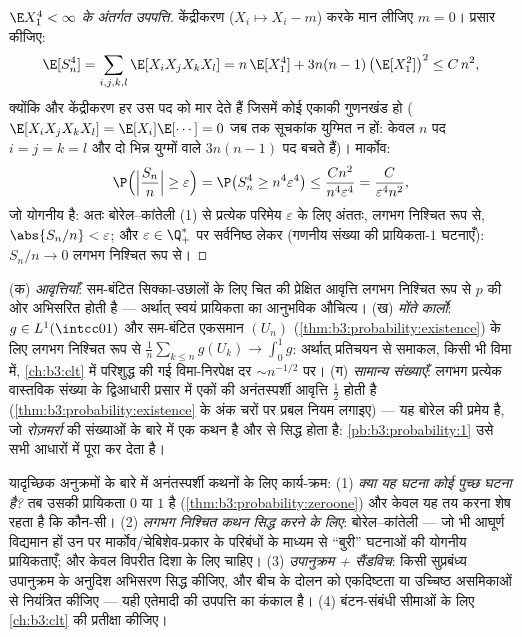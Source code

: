\begin{proof}[$\E X_1^4 < \infty$ के अंतर्गत उपपत्ति]
केंद्रीकरण ($X_i \mapsto X_i - m$) करके मान लीजिए $m = 0$। प्रसार कीजिए:
\[
\E[S_n^4] = \sum_{i,j,k,l}\E[X_iX_jX_kX_l]
= n\,\E[X_1^4] + 3n(n-1)\,\bigl(\E[X_1^2]\bigr)^2 \leq
C\,n^2 ,
\]
क्योंकि  और केंद्रीकरण हर उस पद को मार देते हैं जिसमें
कोई एकाकी गुणनखंड हो ($\E[X_iX_jX_kX_l] =
\E[X_i]\E[\cdots] = 0$ जब तक सूचकांक युग्मित न हों: केवल
$n$ पद $i=j=k=l$ और दो भिन्न युग्मों वाले $3n(n-1)$ पद बचते हैं)।
मार्कोव:
\[
\P\Bigl(\Bigl|\frac{S_n}n\Bigr| \geq \varepsilon\Bigr)
= \P\bigl(S_n^4 \geq n^4\varepsilon^4\bigr)
\leq \frac{Cn^2}{n^4\varepsilon^4} =
\frac{C}{\varepsilon^4n^2},
\]
जो योगनीय है: अतः बोरेल--कांतेली (1) से प्रत्येक परिमेय $\varepsilon$ के
लिए अंततः, लगभग निश्चित रूप से, $\abs{S_n/n} < \varepsilon$; और $\varepsilon \in \Q_+^*$ पर सर्वनिष्ठ लेकर
(गणनीय संख्या की प्रायिकता-$1$ घटनाएँ): $S_n/n \to 0$ लगभग निश्चित रूप
से।
\end{proof}

\begin{example}[प्रबल नियम से क्या मिलता है]
\label{ex:b3:probability:sllnapps}
(क) \emph{आवृत्तियाँ}:  सम-बंटित सिक्का-उछालों के लिए चित
की प्रेक्षित आवृत्ति लगभग निश्चित रूप से $p$ की ओर अभिसरित होती
है --- अर्थात् स्वयं प्रायिकता का आनुभविक औचित्य।
(ख) \emph{मोंते कार्लो}: $g \in
L^1(\intcc01)$ और 
सम-बंटित एकसमान $(U_n)$ (\cref{thm:b3:probability:existence}) के लिए लगभग निश्चित रूप से $\frac1n\sum_{k\leq n}g(U_k) \to \int_0^1g$:
अर्थात् प्रतिचयन से समाकल, किसी भी विमा में, \cref{ch:b3:clt} में परिशुद्ध की
गई विमा-निरपेक्ष दर $\sim n^{-1/2}$ पर।
(ग) \emph{सामान्य संख्याएँ}: लगभग प्रत्येक वास्तविक संख्या के
द्विआधारी प्रसार में एकों की अनंतस्पर्शी आवृत्ति $\frac12$ होती है
(\cref{thm:b3:probability:existence} के अंक चरों पर प्रबल नियम लगाइए) --- यह बोरेल की प्रमेय है,
जो \emph{रोज़मर्रा} की संख्याओं के बारे में एक कथन है और  से सिद्ध
होता है: \cref{pb:b3:probability:1} उसे सभी आधारों में पूरा कर देता है।
\end{example}

\begin{method}\label{met:b3:probability:toolkit}
यादृच्छिक अनुक्रमों के बारे में अनंतस्पर्शी कथनों के लिए कार्य-क्रम:
(1) \emph{क्या यह घटना कोई पुच्छ घटना है?} तब उसकी प्रायिकता $0$
या $1$ है (\cref{thm:b3:probability:zeroone}) और केवल यह तय करना शेष रहता है कि कौन-सी।
(2) \emph{लगभग निश्चित कथन सिद्ध करने के लिए}: बोरेल--कांतेली ---
जो भी आघूर्ण विद्यमान हों उन पर मार्कोव/चेबिशेव-प्रकार के परिबंधों
के माध्यम से ``बुरी'' घटनाओं की योगनीय प्रायिकताएँ; और 
केवल विपरीत दिशा के लिए चाहिए। (3) \emph{उपानुक्रम + सैंडविच}: किसी
सुप्रबंध्य उपानुक्रम के अनुदिश अभिसरण सिद्ध कीजिए, और बीच के दोलन
को एकदिष्टता या उच्चिष्ठ असमिकाओं से नियंत्रित कीजिए --- यही
एतेमादी की उपपत्ति का कंकाल है। (4) बंटन-संबंधी सीमाओं के लिए \cref{ch:b3:clt}
की प्रतीक्षा कीजिए।
\end{method}


